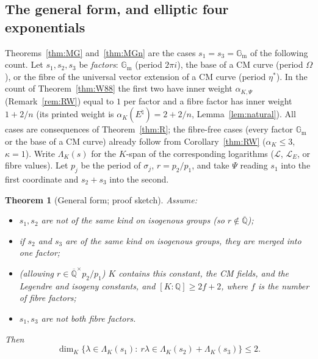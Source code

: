 \documentclass[11pt]{amsart}
\newtheorem{theorem}{Theorem}[section]
\theoremstyle{definition}
\newcommand{\Qb}{\overline{\mathbb{Q}}}
\newcommand{\Q}{\mathbb{Q}}
\newcommand{\Gm}{\mathbb{G}_{\mathrm m}}
\newcommand{\Lg}{\mathcal{L}}
\begin{document}
\subsection{The general form, and elliptic four exponentials}\label{sec:MGgen}
Theorems~\ref{thm:MG} and~\ref{thm:MGn} are the cases $s_1=s_3=\Gm$ of the following count. Let
$s_1,s_2,s_3$ be \emph{factors}: $\Gm$ (period $2\pi i$), the base of a CM curve (period $\Omega$), or the fibre of
the universal vector extension of a CM curve (period $\eta^*$). In the count of Theorem~\ref{thm:W88} the first two have
inner weight $\alpha_{K,\Psi}$ (Remark~\ref{rem:RW}) equal to $1$ per factor and a fibre factor has inner weight $1+2/n$
(its printed weight is $\alpha_K(E^\natural)=2+2/n$, Lemma~\ref{lem:natural}). All cases are consequences of Theorem~\ref{thm:R}; the fibre-free
cases (every factor $\Gm$ or the base of a CM curve) already follow from Corollary~\ref{thm:RW} ($\alpha_K\le3$, $\kappa=1$). Write
$\Lambda_K(s)$ for the
$K$-span of the corresponding logarithms ($\Lg$, $\Lg_E$, or fibre values). Let $p_j$ be the period of $\sigma_j$,
$r=p_2/p_1$, and take $\Psi$ reading $s_1$ into the first coordinate and $s_2+s_3$ into the second.

\begin{theorem}[General form; proof sketch]\label{thm:MGgen}
Assume:
\begin{itemize}
\item $s_1,s_2$ are not of the same kind on isogenous groups (so $r\notin\Qb$);
\item if $s_2$ and $s_3$ are of the same kind on isogenous groups, they are merged into one factor;
\item (allowing $r\in\Qb^\times p_2/p_1$) $K$ contains this constant, the CM fields, and the Legendre and isogeny constants,
and $[K:\Q]\ge2f+2$, where $f$ is the number of fibre factors;
\item $s_1,s_3$ are not both fibre factors.
\end{itemize}
Then
\[
\dim_K\{\lambda\in\Lambda_K(s_1):\ r\lambda\in\Lambda_K(s_2)+\Lambda_K(s_3)\}\le2 .
\]
\end{theorem}
\end{document}
